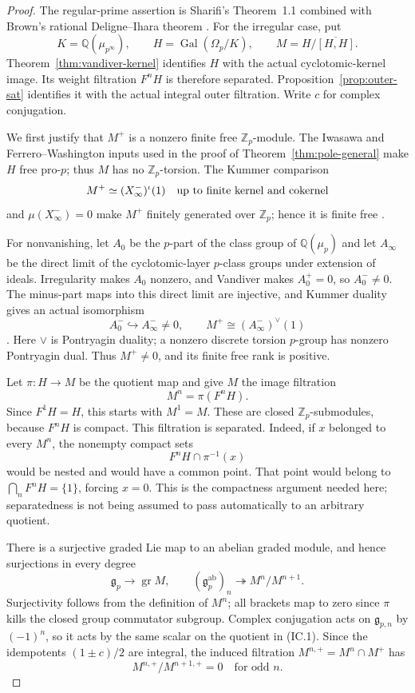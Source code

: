 \begin{proof}
The regular-prime assertion is Sharifi's Theorem~1.1 combined with
Brown's rational Deligne--Ihara theorem
\cite[Theorem~1.1, p.~2]{Sharifi2002}\cite[\S\S2.1--2.3]{Brown2019}.
For the irregular case, put
\[
 K=\mathbb Q(\mu_{p^\infty}),\qquad
 H=\operatorname{Gal}(\Omega_p/K),\qquad
 M=H/\overline{[H,H]}.
\]
Theorem~\ref{thm:vandiver-kernel} identifies $H$ with the actual
cyclotomic-kernel image.  Its weight filtration $F^nH$ is therefore
separated.  Proposition~\ref{prop:outer-sat} identifies it with the
actual integral outer filtration.  Write $c$ for complex conjugation.

We first justify that $M^+$ is a nonzero finite free
$\mathbb Z_p$-module.  The Iwasawa and Ferrero--Washington inputs used
in the proof of Theorem~\ref{thm:pole-general} make $H$ free pro-$p$;
thus $M$ has no $\mathbb Z_p$-torsion.  The Kummer comparison
\[
 M^+\simeq (X_\infty^-)^\iota(1)
 \quad\hbox{up to finite kernel and cokernel}
\]
and $\mu(X_\infty^-)=0$ make $M^+$ finitely generated over
$\mathbb Z_p$; hence it is finite free
\cite[Theorem~2]{Iwasawa1981}
\cite[Proposition~3.4.7 and Corollary~3.4.8]{SharifiIwasawaNotes}.

For nonvanishing, let $A_0$ be the $p$-part of the class group of
$\mathbb Q(\mu_p)$ and let $A_\infty$ be the direct limit of the
cyclotomic-layer $p$-class groups under extension of ideals.
Irregularity makes $A_0$ nonzero, and Vandiver makes $A_0^+=0$,
so $A_0^-\ne0$.  The minus-part maps into this direct limit are
injective, and Kummer duality gives an actual isomorphism
\[
 A_0^-\hookrightarrow A_\infty^-\ne0,
 \qquad M^+\cong(A_\infty^-)^\vee(1)
\]
\cite[Propositions~3.4.1 and~3.4.7]{SharifiIwasawaNotes}.
Here $\vee$ is Pontryagin duality; a nonzero discrete torsion
$p$-group has nonzero Pontryagin dual.  Thus $M^+\ne0$, and its
finite free rank is positive.

Let $\pi:H\to M$ be the quotient map and give $M$ the image
filtration
\[
 M^n=\pi(F^nH).
\]
Since $F^1H=H$, this starts with $M^1=M$.
These are closed $\mathbb Z_p$-submodules, because $F^nH$ is
compact.  This filtration is separated.  Indeed, if $x$ belonged
to every $M^n$, the nonempty compact sets
\[
 F^nH\cap\pi^{-1}(x)
\]
would be nested and would have a common point.  That point would
belong to $\bigcap_nF^nH=\{1\}$, forcing $x=0$.
This is the compactness argument needed here; separatedness is
not being assumed to pass automatically to an arbitrary quotient.

There is a surjective graded Lie map to an abelian graded module,
and hence surjections in every degree
\[
 \mathfrak g_p\longrightarrow\operatorname{gr}M,
 \qquad
 (\mathfrak g_p^{\mathrm{ab}})_n
       \twoheadrightarrow M^n/M^{n+1}.                       \tag{IC.1}
\]
Surjectivity follows from the definition of $M^n$; all brackets
map to zero since $\pi$ kills the closed group commutator subgroup.
Complex conjugation acts on $\mathfrak g_{p,n}$ by $(-1)^n$,
so it acts by the same scalar on the quotient in (IC.1).
Since the idempotents $(1\pm c)/2$ are integral, the induced
filtration $M^{n,+}=M^n\cap M^+$ has
\[
 M^{n,+}/M^{n+1,+}=0\quad\text{for odd }n.                   \tag{IC.2}
\]


\end{proof}
